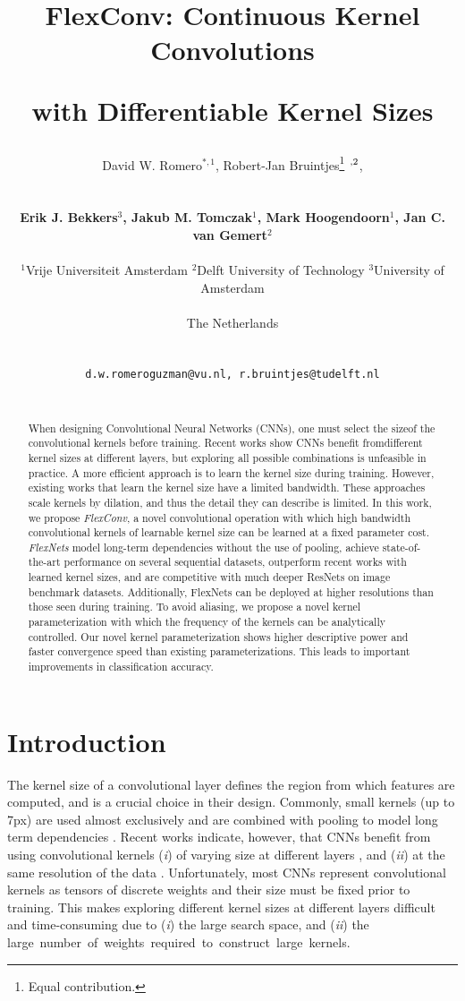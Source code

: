 \documentclass{article} \usepackage{iclr2022_conference,times}
\title{\centerline{FlexConv: Continuous Kernel Convolutions} \centerline{with Differentiable Kernel Sizes}}
\author{\centerline{David W. Romero$^{*, 1}$, Robert-Jan Bruintjes\thanks{Equal contribution.} $\hspace{0.2mm}^{,2}$,} \\ \centerline{\textbf{Erik J. Bekkers$^{3}$, Jakub M. Tomczak$^{1}$, Mark Hoogendoorn$^{1}$, Jan C. van Gemert$^{2}$}}\\
  ${^1}$\hspace{0.5mm}Vrije Universiteit Amsterdam \quad ${^2}$\hspace{0.5mm}Delft University of Technology \quad $^{3}$\hspace{0.5mm}University of Amsterdam\\
  \centerline{The Netherlands}\\
  \centerline{\texttt{d.w.romeroguzman@vu.nl, r.bruintjes@tudelft.nl}}\\
}
\begin{document}
\maketitle

\vspace{-2mm}
\begin{abstract}
   When designing Convolutional Neural Networks (CNNs), one must select the size\break of the convolutional kernels before training.
   Recent works show CNNs benefit from\break different kernel sizes at different layers, but exploring all possible combinations is unfeasible in practice. A more efficient approach is to learn the kernel size during training.
   However, existing works that learn the kernel size have a limited bandwidth.
   These approaches scale kernels by dilation, and thus the detail they can describe is limited.
   In this work, we propose \textit{FlexConv}, a novel convolutional operation with which high bandwidth convolutional kernels of learnable kernel size can be learned at a fixed parameter cost. \textit{FlexNets} model long-term dependencies without the use of pooling, achieve state-of-the-art performance on several sequential datasets, outperform recent works with learned kernel sizes, and are competitive with much deeper ResNets on image benchmark datasets. Additionally, FlexNets can be deployed at higher resolutions than those seen during training. To avoid aliasing, we propose a novel kernel parameterization with which the frequency of the kernels can be analytically controlled.
   Our novel kernel parameterization shows higher descriptive power and faster convergence speed than existing parameterizations. This leads to important improvements in classification accuracy.
\end{abstract}
\vspace{-3mm}
\section{Introduction}
\vspace{-1mm}
The kernel size of a convolutional layer defines the region from which features are computed, and is a crucial choice in their design. Commonly, small kernels (up to 7px) are used almost exclusively and are combined with pooling to model long term dependencies \citep{simonyan2014very, szegedy2015going, he2016deep,  tan2019efficientnet}. Recent works indicate, however, that CNNs benefit from using convolutional kernels (\emph{i}) of varying size at different layers \citep{pintea2021resolution, tomen2021deep}, and (\emph{ii}) at the same resolution of the data \citep{peng2017large,cordonnier2019relationship, romero2021ckconv}. Unfortunately, most CNNs represent convolutional kernels as tensors of discrete weights and their size must be fixed prior to training. This makes exploring different kernel sizes at different layers difficult and time-consuming due to (\textit{i}) the large search space, and (\textit{ii}) the large~number~of~weights~required~to~construct~large~kernels.
\end{document}
